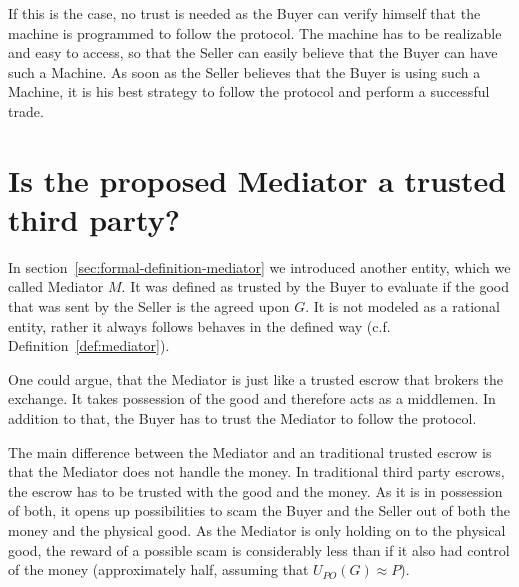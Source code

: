 \documentclass{cacthesis}
\newcommand{\authnote}[3]{{ \footnotesize \textbf{#1[#2: #3]~}}}
\newcommand{\orfnote}[1]{\authnote{\color{blue}}{Orfeas}{#1}}
\newcommand{\niknote}[1]{\authnote{\color{red}}{Nikos}{#1}}
\begin{document}
If this is the case, no trust is needed as the Buyer can verify himself that the machine is programmed to follow the protocol. The machine has to be realizable and easy to access, so that the Seller can
easily believe that the Buyer can have such a Machine. As soon as the Seller believes that the Buyer is using such a Machine, it is his best strategy to follow the protocol and perform a successful trade.



\section{Is the proposed Mediator a trusted third party?}

In section~\ref{sec:formal-definition-mediator} we introduced another entity, which we called Mediator $M$. It was defined as trusted by the Buyer to evaluate if the good that was sent by the Seller is the agreed upon $G$. It is not modeled as a rational entity, rather it always follows behaves in the defined way (c.f. Definition~\ref{def:mediator}).\newline

One could argue, that the Mediator is just like a trusted escrow that brokers the exchange. It takes possession of the good and therefore acts as a middlemen. In addition to that, the Buyer has to trust the Mediator to follow the protocol.\newline

The main difference between the Mediator and an traditional trusted escrow is that the Mediator does not handle the money. In traditional third party escrows, the escrow has to be trusted with the good and the money. As it is in possession of both, it opens up possibilities to scam the Buyer and the Seller out of both the money and the physical good.
As the Mediator is only holding on to the physical good, the reward of a possible scam is considerably less than if it also had control of the money (approximately half, assuming that $U_{PO}(G) \approx P$).\newline
\end{document}
